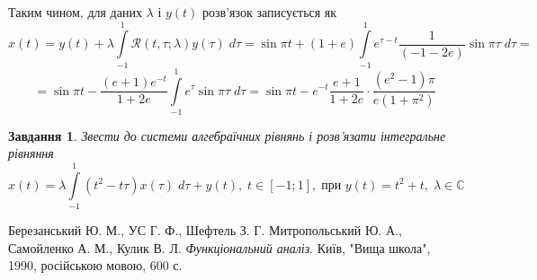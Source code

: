 \documentclass[12pt]{article} %
\newtheorem{prob}{Завдання}
\let\oldint\int
\renewcommand{\int}{\oldint\limits}
\begin{document}
	Таким чином, для даних $\lambda$ і $y(t)$ розв’язок записується як
	\[x(t)=y(t)+\lambda\int_{-1}^1\mathcal{R}(t,\tau;\lambda)y(\tau)\;d\tau=\sin\pi t+(1+e)\int_{-1}^1e^{\tau-t}\frac{1}{(-1-2e)}
	\sin\pi\tau\;d\tau=\]
	\[=\sin\pi t-\frac{(e+1)e^{-t}}{1+2e}\int_{-1}^1e^\tau\sin\pi\tau\;d\tau=\sin\pi t-e^{-t}\frac{e+1}{1+2e}\cdot
	\frac{(e^2-1)\pi}{e(1+\pi^2)}\]
\begin{prob}Звести до системи алгебраїчних рівнянь і розв’язати інтегральне рівняння
	\[x(t)=\lambda\int_{-1}^1(t^2-t\tau)x(\tau)\;d\tau+y(t),\;t\in[-1;1],\;\mbox{при }y(t)=t^2+t,\;\lambda\in\mathbb{C}\]
\end{prob}

\begin{thebibliography}{9}
Березанський Ю. М., УС Г. Ф., Шефтель З. Г.
Митропольський Ю. А., Самойленко А. М., Кулик В. Л.
\emph{Функціональний аналіз}.
Київ, "Вища школа"{}, 1990, російською мовою, 600 с.
\end{thebibliography}
\end{document}

